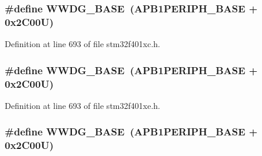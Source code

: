 \subsubsection[{\texorpdfstring{W\+W\+D\+G\+\_\+\+B\+A\+SE}{WWDG_BASE}}]{\setlength{\rightskip}{0pt plus 5cm}\#define W\+W\+D\+G\+\_\+\+B\+A\+SE~({\bf A\+P\+B1\+P\+E\+R\+I\+P\+H\+\_\+\+B\+A\+SE} + 0x2\+C00\+U)}\hypertarget{group___peripheral__registers__structures_ga9a5bf4728ab93dea5b569f5b972cbe62}{}\label{group___peripheral__registers__structures_ga9a5bf4728ab93dea5b569f5b972cbe62}


Definition at line 693 of file stm32f401xc.\+h.

\subsubsection[{\texorpdfstring{W\+W\+D\+G\+\_\+\+B\+A\+SE}{WWDG_BASE}}]{\setlength{\rightskip}{0pt plus 5cm}\#define W\+W\+D\+G\+\_\+\+B\+A\+SE~({\bf A\+P\+B1\+P\+E\+R\+I\+P\+H\+\_\+\+B\+A\+SE} + 0x2\+C00\+U)}\hypertarget{group___peripheral__registers__structures_ga9a5bf4728ab93dea5b569f5b972cbe62}{}\label{group___peripheral__registers__structures_ga9a5bf4728ab93dea5b569f5b972cbe62}


Definition at line 693 of file stm32f401xe.\+h.

\subsubsection[{\texorpdfstring{W\+W\+D\+G\+\_\+\+B\+A\+SE}{WWDG_BASE}}]{\setlength{\rightskip}{0pt plus 5cm}\#define W\+W\+D\+G\+\_\+\+B\+A\+SE~({\bf A\+P\+B1\+P\+E\+R\+I\+P\+H\+\_\+\+B\+A\+SE} + 0x2\+C00\+U)}\hypertarget{group___peripheral__registers__structures_ga9a5bf4728ab93dea5b569f5b972cbe62}{}\label{group___peripheral__registers__structures_ga9a5bf4728ab93dea5b569f5b972cbe62}


